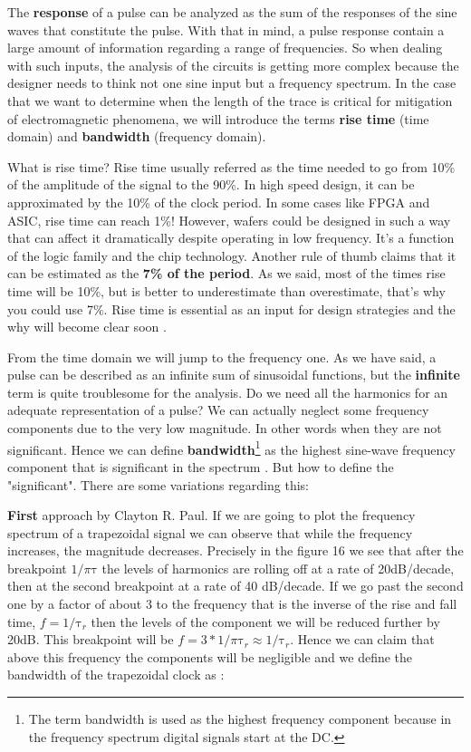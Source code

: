 \documentclass[final]{cubedoc}
\begin{document}
	
	The \textbf{response} of a pulse can be analyzed as the sum of the responses of the sine waves that constitute the pulse. With that in mind, a pulse response contain a large amount of information regarding a range of frequencies. So when dealing with such inputs, the analysis of the circuits is getting more complex because the designer needs to think not one sine input but a frequency spectrum. In the case that we want to determine when the length of the trace is critical for mitigation of electromagnetic phenomena, we will introduce the terms \textbf{rise time} (time domain) and \textbf{bandwidth} (frequency domain).
	
	What is rise time? Rise time usually referred as the time needed to go from 10\% of the amplitude of the signal to the 90\%.
	In high speed design, it can be approximated by the 10\% of the clock period. In some cases like FPGA and ASIC, rise time can reach 1\%! However, wafers could be designed in such a way that can affect it dramatically despite operating in low frequency. It's a function of the logic family and the chip technology.
	Another rule of thumb claims that it can be estimated as the\textbf{ 7\% of the period}. As we said, most of the times rise time will be 10\%, but is better to underestimate than overestimate, that's why you could use 7\%. Rise time is essential as an input for design strategies and the why will become clear soon \cite{bogatin2009signal}.
	
	
	From the time domain we will jump to the frequency one. As we have said, a pulse can be described as an infinite sum of sinusoidal functions, but the \textbf{infinite} term is quite troublesome for the analysis. Do we need all the harmonics for an adequate representation of a pulse? We can actually neglect some frequency components due to the very low magnitude. In other words when they are not significant. Hence we can define \textbf{bandwidth}\footnote{The term bandwidth is used as the highest frequency component because in the frequency spectrum digital signals start at the DC.} as the highest sine-wave frequency component that is significant in the spectrum \cite{bogatin2009signal}. But how to define the "significant". There are some variations regarding this:
	
	\textbf{First} approach by Clayton R. Paul. If we are going to plot the frequency spectrum of a trapezoidal signal we can observe that while the frequency increases, the magnitude decreases. Precisely in the figure 16 we see that after the breakpoint $1/\pi\text{τ}$ the levels of harmonics are rolling off at a rate of 20dB/decade, then at the second breakpoint at a rate of 40 dB/decade. If we go past the second one by a factor of about 3 to the frequency that is the inverse of the rise and fall time, $f = 1/\text{τ}_r$ then the levels of the component we will be reduced further by 20dB. This breakpoint will be $f = 3 * 1/\pi\text{τ}_r \approx 1/\text{τ}_r$.  Hence we can claim that above this frequency the components will be negligible and we define the bandwidth of the trapezoidal clock as \cite{paul2011transmission}:
	
\end{document}
